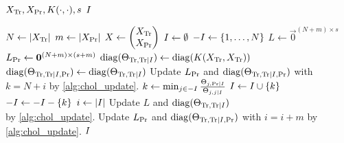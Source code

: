 \begin{algorithmic}[1]
  \REQUIRE \( X_{\text{Tr}}, X_{\text{Pr}}, K(\cdot, \cdot), s \)
  \ENSURE \( I \)

  \STATE \( N \gets \lvert X_{\text{Tr}}\rvert \)
  \STATE \( m \gets \lvert X_{\text{Pr}}\rvert \)
  \STATE \(
    X \gets
    \begin{pmatrix}
      X_{\text{Tr}} \\
      X_{\text{Pr}}
    \end{pmatrix}
  \)
  \STATE \( I \gets \emptyset \)
  \STATE \( -I \gets \{ 1, \dotsc, N \} \)
  \STATE \( L \gets \vec{0}^{(N + m) \times s} \)
  \STATE \( L_{\text{Pr}} \gets \bm{0}^{(N + m) \times (s + m)} \)
  \STATE \(
    \operatorname{diag}(\Theta_{\text{Tr}, \text{Tr} \mid I}) \gets
    \operatorname{diag}(K(X_{\text{Tr}}, X_{\text{Tr}}))
  \)
  \STATE \(
    \operatorname{diag}(\Theta_{\text{Tr}, \text{Tr} \mid I, \text{Pr}}) \gets
    \operatorname{diag}(\Theta_{\text{Tr}, \text{Tr} \mid I})
  \)
    \STATE Update \( L_{\text{Pr}} \) and \( \operatorname{diag}(\Theta_{\text{Tr}, \text{Tr}
      \mid I, \text{Pr}}) \) with \( k = N + i \) by \cref{alg:chol_update}.
  \ENDFOR
    \STATE \(
      k \gets \min_{j \in -I}
      \frac{\Theta_{j, \text{Pr} \mid I}}{\Theta_{j, j \mid I}}
    \)
    \STATE \( I \gets I \cup \{ k \} \)
    \STATE \( -I \gets -I - \{ k \} \)
    \STATE \( i \gets \lvert I\rvert \)
    \STATE Update \( L \) and \( \operatorname{diag}(\Theta_{\text{Tr}, \text{Tr}
      \mid I}) \) \\ by \cref{alg:chol_update}.
    \STATE Update \( L_{\text{Pr}} \) and \( \operatorname{diag}(\Theta_{\text{Tr}, \text{Tr}
      \mid I, \text{Pr}}) \) with \( i = i + m \) by \cref{alg:chol_update}.
  \ENDWHILE
  \RETURN \( I \)
\end{algorithmic}
